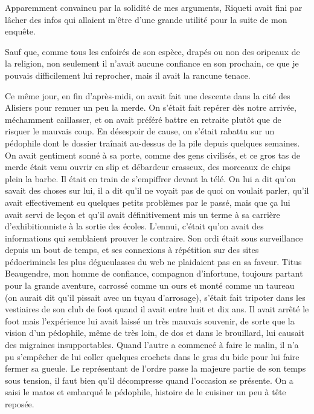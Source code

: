 Apparemment convaincu par la solidité de mes arguments, Riqueti avait fini par lâcher des infos qui allaient m’être d’une grande utilité pour la suite de mon enquête.

Sauf que, comme tous les enfoirés de son espèce, drapés ou non des oripeaux de la religion, non seulement il n’avait aucune confiance en son prochain, ce que je pouvais difficilement lui reprocher, mais il avait la rancune tenace.

%
%

\scene

Ce même jour, en fin d’après-midi, on avait fait une descente dans la cité des Alisiers pour remuer un peu la merde. On s’était fait repérer dès notre arrivée, méchamment caillasser, et on avait préféré battre en retraite plutôt que de risquer le mauvais coup. En désespoir de cause, on s’était rabattu sur un pédophile dont le dossier traînait au-dessus de la pile depuis quelques semaines. On avait gentiment sonné à sa porte, comme des gens civilisés, et ce gros tas de merde était venu ouvrir en slip et débardeur crasseux, des morceaux de chips plein la barbe. Il était en train de s’empiffrer devant la télé. On lui a dit qu’on savait des choses sur lui, il a dit qu’il ne voyait pas de quoi on voulait parler, qu’il avait effectivement eu quelques petits problèmes par le passé, mais que ça lui avait servi de leçon et qu’il avait définitivement mis un terme à sa carrière d’exhibitionniste à la sortie des écoles. L’ennui, c’était qu’on avait des informations qui semblaient prouver le contraire. Son ordi était sous surveillance depuis un bout de temps, et ses connexions à répétition sur des sites pédocriminels les plus dégueulasses du web ne plaidaient pas en sa faveur. Titus Beaugendre, mon homme de confiance, compagnon d’infortune, toujours partant pour la grande aventure, carrossé comme un ours et monté comme un taureau (on aurait dit qu’il pissait avec un tuyau d’arrosage), s’était fait tripoter dans les vestiaires de son club de foot quand il avait entre huit et dix ans. Il avait arrêté le foot mais l’expérience lui avait laissé un très mauvais souvenir, de sorte que la vision d’un pédophile, même de très loin, de dos et dans le brouillard, lui causait des migraines insupportables. Quand l’autre a commencé à faire le malin, il n’a pu s’empêcher de lui coller quelques crochets dans le gras du bide pour lui faire fermer sa gueule. Le représentant de l’ordre passe la majeure partie de son temps sous tension, il faut bien qu’il décompresse quand l’occasion se présente. On a saisi le matos et embarqué le pédophile, histoire de le cuisiner un peu à tête reposée.

